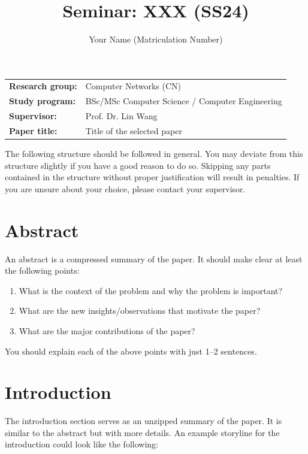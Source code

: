 \documentclass{upb-cn}
\title{Seminar: XXX (SS24)}
\author{Your Name (Matriculation Number)}
\begin{document}
\maketitle

\begin{notebox}
    \begin{tabular}{@{}ll}
        \textbf{Research group:} & Computer Networks (CN) \\
        \textbf{Study program:} & BSc/MSc Computer Science / Computer Engineering \\
        \textbf{Supervisor:} & Prof. Dr. Lin Wang \\
        \textbf{Paper title:} & Title of the selected paper
    \end{tabular}
\end{notebox}

The following structure should be followed in general. You may deviate from this structure slightly if you have a good reason to do so. Skipping any parts contained in the structure without proper justification will result in penalties. If you are unsure about your choice, please contact your supervisor.

\section*{Abstract}

An abstract is a compressed summary of the paper. It should make clear at least the following points:
\begin{enumerate}
    \item What is the context of the problem and why the problem is important?
    \item What are the new insights/observations that motivate the paper?
    \item What are the major contributions of the paper?
\end{enumerate}

You should explain each of the above points with just 1--2 sentences.

\section{Introduction}
\label{sec:introduction}

The introduction section serves as an unzipped summary of the paper. It is similar to the abstract but with more details. An example storyline for the introduction could look like the following:
\end{document}
